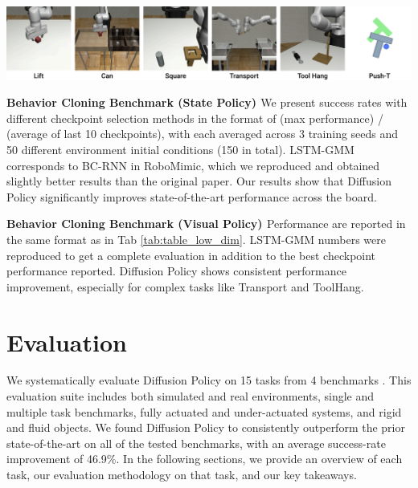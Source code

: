 \begin{table}[h]

~~~~~~~~~~~~~~~~~~~~~~~~~~~~~~~~~~~~
\includegraphics[width=0.835\linewidth]{figure/sim_task_thumbnails.pdf}
\label{tab:sim_benchmark_state}

\vspace{1mm}
{
\centering


\caption{\textbf{Behavior Cloning Benchmark (State Policy) \label{tab:table_low_dim} }
We present success rates with different checkpoint selection methods in the format of (max performance) / (average of last 10 checkpoints), with each averaged across 3 training seeds and 50 different environment initial conditions (150 in total).
LSTM-GMM corresponds to BC-RNN in RoboMimic\cite{robomimic}, which we reproduced and obtained slightly {better} results than the original paper. Our results show that Diffusion Policy significantly improves state-of-the-art performance across the board.
}
\vspace{2mm}



\caption{\textbf{Behavior Cloning Benchmark (Visual Policy) \label{tab:table_image}} Performance are reported in the same format as in Tab \ref{tab:table_low_dim}. LSTM-GMM numbers were reproduced to get a complete evaluation in addition to the best checkpoint performance reported. Diffusion Policy shows consistent performance improvement, especially for complex tasks like Transport and ToolHang. }
}
\end{table}

\section{Evaluation}
We systematically evaluate Diffusion Policy on 15 tasks from 4 benchmarks \cite{ibc, gupta2019relay, robomimic, bet}. This evaluation suite includes both simulated and real environments, single and multiple task benchmarks, fully actuated and under-actuated systems, and rigid and fluid objects.  We found Diffusion Policy to consistently outperform the prior state-of-the-art on all of the tested benchmarks, with an average success-rate improvement of 46.9\%. In the following sections, we  provide an overview of each task, our evaluation methodology on that task, and our key takeaways.

